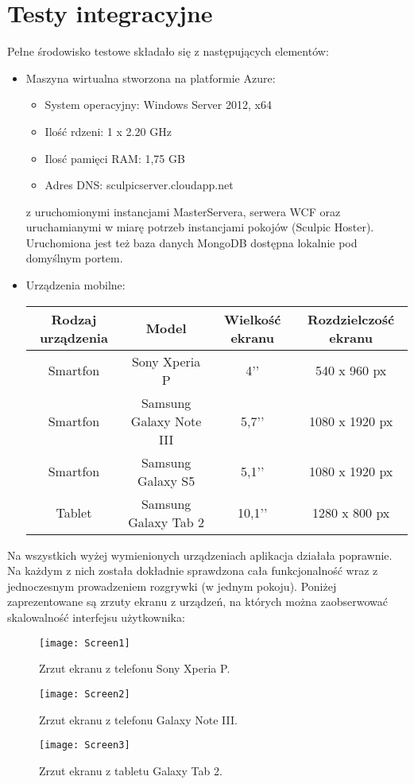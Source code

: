 \section{Testy integracyjne}
Pełne środowisko testowe składało się z następujących elementów:
\begin{itemize}
    \item Maszyna wirtualna stworzona na platformie Azure:
    \begin{itemize}
    \item System operacyjny: Windows Server 2012, x64
    \item Ilość rdzeni: 1 x 2.20 GHz
    \item Ilosć pamięci RAM: 1,75 GB
    \item Adres DNS: sculpicserver.cloudapp.net
    \end{itemize}
    z uruchomionymi instancjami MasterServera, serwera WCF oraz uruchamianymi w miarę potrzeb instancjami pokojów (Sculpic Hoster). Uruchomiona jest też baza danych MongoDB dostępna lokalnie pod domyślnym portem.
    \item Urządzenia mobilne:
    \begin{center}
    \begin{tabular}{|c|c|c|c|}
    \hline
    Rodzaj urządzenia & Model & Wielkość ekranu & Rozdzielczość ekranu \\ \hline
    Smartfon & Sony Xperia P & 4’’ & 540 x 960 px \\ \hline
    Smartfon & Samsung Galaxy Note III & 5,7’’ & 1080 x 1920 px \\ \hline
    Smartfon & Samsung Galaxy S5 & 5,1’’ & 1080 x 1920 px \\ \hline
    Tablet & Samsung Galaxy Tab 2 & 10,1’’ & 1280 x 800 px \\ \hline
    \end{tabular}
    \end{center}
\end{itemize}

Na wszystkich wyżej wymienionych urządzeniach aplikacja działała poprawnie. Na każdym z nich została dokładnie sprawdzona cała funkcjonalność wraz z jednoczesnym prowadzeniem rozgrywki (w jednym pokoju). Poniżej zaprezentowane są zrzuty ekranu z urządzeń, na których można zaobserwować skalowalność interfejsu użytkownika:

\begin{figure}[htbp]
\centering
\texttt{[image: Screen1]}
\caption{Zrzut ekranu z telefonu Sony Xperia P.}
\label{fig:screen1}
\end{figure}

\begin{figure}[htbp]
\centering
\texttt{[image: Screen2]}
\caption{Zrzut ekranu z telefonu Galaxy Note III.}
\label{fig:screen2}
\end{figure}

\begin{figure}[htbp]
\centering
\texttt{[image: Screen3]}
\caption{Zrzut ekranu z tabletu Galaxy Tab 2.}
\label{fig:screen3}
\end{figure}